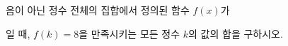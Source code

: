 \hspace*{2mm}\begin{minipage}[t]{\dimexpr\linewidth-2mm\relax}\vspace{0pt}
음이 아닌 정수 전체의 집합에서 정의된 함수 $f(x)$가\par\smallskip{}\par\smallskip\noindent 일 때, $f(k)=8$을 만족시키는 모든 정수 $k$의 값의 합을 구하시오.\end{minipage}
